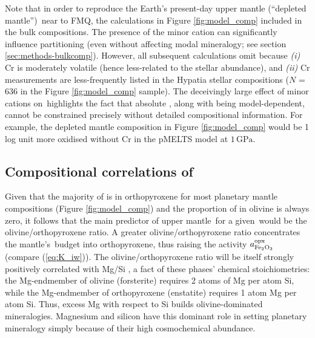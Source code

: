 
Note that in order to reproduce the Earth's present-day upper mantle (``depleted mantle'') \fo\,near to FMQ, the calculations in Figure \ref{fig:model_comp} included  in the bulk compositions. The presence of the minor cation  can significantly influence  partitioning (even without affecting modal mineralogy; see section \ref{sec:methods-bulkcomp}). However, all subsequent calculations omit  because \textit{(i)} Cr is moderately volatile (hence less-related to the stellar abundance), and \textit{(ii)} Cr measurements are less-frequently listed in the Hypatia stellar compositions ($N$ = 636 in the Figure \ref{fig:model_comp} sample). The deceivingly large effect of minor cations on \fo\,highlights the fact that absolute \fo, along with being model-dependent, cannot be constrained precisely without detailed compositional information. For example, the depleted mantle composition in Figure \ref{fig:model_comp} would be 1 log unit more oxidised without Cr in the pMELTS model at $1\,\text{GPa}$.



\subsection{Compositional correlations of \fo}

Given that the majority of  is in orthopyroxene for most planetary mantle compositions (Figure \ref{fig:model_comp}) and the proportion of  in olivine is always zero, it follows that the main predictor of upper mantle \fo\,for a given \xfer\,would be the olivine/orthopyroxene ratio. A greater olivine/orthopyroxene ratio concentrates the mantle's \ferric\,budget into orthopyroxene, thus raising the activity $a_{\rm Fe_2O_3}^{\rm opx}$ (compare (\ref{eq:K_iw})). The olivine/orthopyroxene ratio will be itself strongly positively correlated with Mg/Si \citep{hinkel_star_2018, spaargaren_plausible_2022, guimond_mantle_2023}, a fact of these phases' chemical stoichiometries: the Mg-endmember of olivine  (forsterite) requires 2 atoms of Mg per atom Si, while the Mg-endmember of orthopyroxene  (enstatite) requires 1 atom Mg per atom Si. Thus, excess Mg with respect to Si builds olivine-dominated mineralogies. Magnesium and silicon have this dominant role in setting planetary mineralogy simply because of their high cosmochemical abundance.

